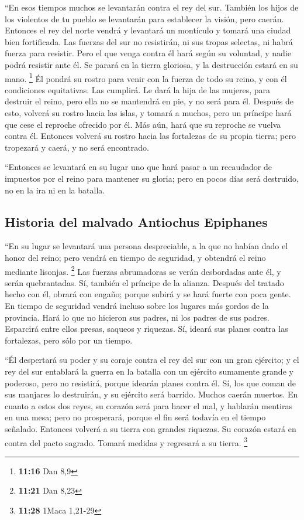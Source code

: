  ``En esos tiempos muchos se levantarán contra el rey del
sur. También los hijos de los violentos de tu pueblo se levantarán para
establecer la visión, pero caerán.  Entonces el rey del
norte vendrá y levantará un montículo y tomará una ciudad bien
fortificada. Las fuerzas del sur no resistirán, ni sus tropas selectas,
ni habrá fuerza para resistir.  Pero el que venga contra
él hará según su voluntad, y nadie podrá resistir ante él. Se parará en
la tierra gloriosa, y la destrucción estará en su mano. \footnote{\textbf{11:16}
  Dan 8,9}  Él pondrá su rostro para venir con la fuerza
de todo su reino, y con él condiciones equitativas. Las cumplirá. Le
dará la hija de las mujeres, para destruir el reino, pero ella no se
mantendrá en pie, y no será para él.  Después de esto,
volverá su rostro hacia las islas, y tomará a muchos, pero un príncipe
hará que cese el reproche ofrecido por él. Más aún, hará que su reproche
se vuelva contra él.  Entonces volverá su rostro hacia
las fortalezas de su propia tierra; pero tropezará y caerá, y no será
encontrado.

 ``Entonces se levantará en su lugar uno que hará pasar a
un recaudador de impuestos por el reino para mantener su gloria; pero en
pocos días será destruido, no en la ira ni en la batalla.

\hypertarget{historia-del-malvado-antiochus-epiphanes}{%
\subsection{Historia del malvado Antiochus
Epiphanes}\label{historia-del-malvado-antiochus-epiphanes}}

 ``En su lugar se levantará una persona despreciable, a
la que no habían dado el honor del reino; pero vendrá en tiempo de
seguridad, y obtendrá el reino mediante lisonjas. \footnote{\textbf{11:21}
  Dan 8,23}  Las fuerzas abrumadoras se verán desbordadas
ante él, y serán quebrantadas. Sí, también el príncipe de la alianza.
 Después del tratado hecho con él, obrará con engaño;
porque subirá y se hará fuerte con poca gente.  En tiempo
de seguridad vendrá incluso sobre los lugares más gordos de la
provincia. Hará lo que no hicieron sus padres, ni los padres de sus
padres. Esparcirá entre ellos presas, saqueos y riquezas. Sí, ideará sus
planes contra las fortalezas, pero sólo por un tiempo.

 ``Él despertará su poder y su coraje contra el rey del
sur con un gran ejército; y el rey del sur entablará la guerra en la
batalla con un ejército sumamente grande y poderoso, pero no resistirá,
porque idearán planes contra él.  Sí, los que coman de
sus manjares lo destruirán, y su ejército será barrido. Muchos caerán
muertos.  En cuanto a estos dos reyes, su corazón será
para hacer el mal, y hablarán mentiras en una mesa; pero no prosperará,
porque el fin será todavía en el tiempo señalado. 
Entonces volverá a su tierra con grandes riquezas. Su corazón estará en
contra del pacto sagrado. Tomará medidas y regresará a su tierra.
\footnote{\textbf{11:28} 1Maca 1,21-29}

